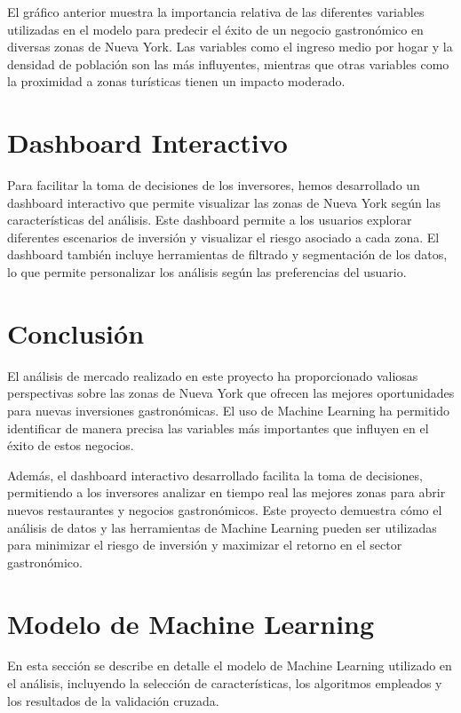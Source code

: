 \documentclass[twoside,11pt]{article}
\begin{document}
El gráfico anterior muestra la importancia relativa de las diferentes variables utilizadas en el modelo para predecir el éxito de un negocio gastronómico en diversas zonas de Nueva York. Las variables como el ingreso medio por hogar y la densidad de población son las más influyentes, mientras que otras variables como la proximidad a zonas turísticas tienen un impacto moderado.

\section{Dashboard Interactivo}

Para facilitar la toma de decisiones de los inversores, hemos desarrollado un dashboard interactivo que permite visualizar las zonas de Nueva York según las características del análisis. Este dashboard permite a los usuarios explorar diferentes escenarios de inversión y visualizar el riesgo asociado a cada zona. El dashboard también incluye herramientas de filtrado y segmentación de los datos, lo que permite personalizar los análisis según las preferencias del usuario.

\section{Conclusión}

El análisis de mercado realizado en este proyecto ha proporcionado valiosas perspectivas sobre las zonas de Nueva York que ofrecen las mejores oportunidades para nuevas inversiones gastronómicas. El uso de Machine Learning ha permitido identificar de manera precisa las variables más importantes que influyen en el éxito de estos negocios.

Además, el dashboard interactivo desarrollado facilita la toma de decisiones, permitiendo a los inversores analizar en tiempo real las mejores zonas para abrir nuevos restaurantes y negocios gastronómicos. Este proyecto demuestra cómo el análisis de datos y las herramientas de Machine Learning pueden ser utilizadas para minimizar el riesgo de inversión y maximizar el retorno en el sector gastronómico.


\newpage

\appendix
\section{Modelo de Machine Learning}
\label{app:modelo_ml}

En esta sección se describe en detalle el modelo de Machine Learning utilizado en el análisis, incluyendo la selección de características, los algoritmos empleados y los resultados de la validación cruzada.

\vskip 0.2in

\end{document}
